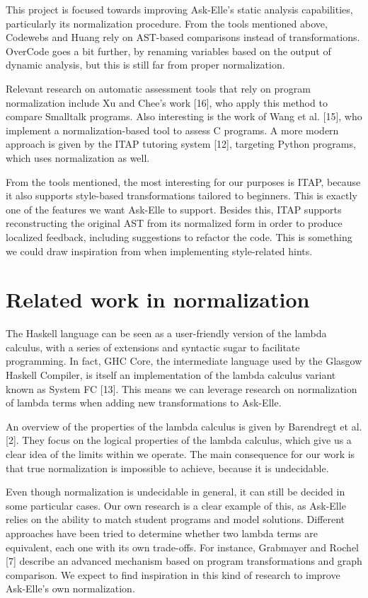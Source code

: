 \documentclass[a4paperpaper,]{report}
\begin{document}
This project is focused towards improving Ask-Elle's static analysis
capabilities, particularly its normalization procedure. From the tools
mentioned above, Codewebs and Huang rely on AST-based comparisons
instead of transformations. OverCode goes a bit further, by renaming
variables based on the output of dynamic analysis, but this is still far
from proper normalization.

Relevant research on automatic assessment tools that rely on program
normalization include Xu and Chee's work {[}16{]}, who apply this method
to compare Smalltalk programs. Also interesting is the work of Wang et
al. {[}15{]}, who implement a normalization-based tool to assess C
programs. A more modern approach is given by the ITAP tutoring system
{[}12{]}, targeting Python programs, which uses normalization as well.

From the tools mentioned, the most interesting for our purposes is ITAP,
because it also supports style-based transformations tailored to
beginners. This is exactly one of the features we want Ask-Elle to
support. Besides this, ITAP supports reconstructing the original AST
from its normalized form in order to produce localized feedback,
including suggestions to refactor the code. This is something we could
draw inspiration from when implementing style-related hints.

\hypertarget{related-work-in-normalization}{%
\section{Related work in
normalization}\label{related-work-in-normalization}}

The Haskell language can be seen as a user-friendly version of the
lambda calculus, with a series of extensions and syntactic sugar to
facilitate programming. In fact, GHC Core, the intermediate language
used by the Glasgow Haskell Compiler, is itself an implementation of the
lambda calculus variant known as System FC {[}13{]}. This means we can
leverage research on normalization of lambda terms when adding new
transformations to Ask-Elle.

An overview of the properties of the lambda calculus is given by
Barendregt et al. {[}2{]}. They focus on the logical properties of the
lambda calculus, which give us a clear idea of the limits within we
operate. The main consequence for our work is that true normalization is
impossible to achieve, because it is undecidable.

Even though normalization is undecidable in general, it can still be
decided in some particular cases. Our own research is a clear example of
this, as Ask-Elle relies on the ability to match student programs and
model solutions. Different approaches have been tried to determine
whether two lambda terms are equivalent, each one with its own
trade-offs. For instance, Grabmayer and Rochel {[}7{]} describe an
advanced mechanism based on program transformations and graph
comparison. We expect to find inspiration in this kind of research to
improve Ask-Elle's own normalization.
\end{document}
